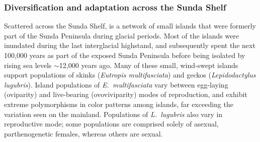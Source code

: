 \subsubsection*{Diversification and adaptation across the Sunda Shelf}
Scattered across the Sunda Shelf, is a network of small islands that were
formerly part of the Sunda Peninsula during glacial periods.
Most of the islands were inundated during the last interglacial highstand, and
subsequently spent the next 100,000 years as part of the exposed Sunda
Peninsula before being isolated by rising sea levels $\sim$12,000 years ago.
Many of these small, wind-swept islands support populations of skinks
(\emph{Eutropis multifasciata}) and geckos (\emph{Lepidodactylus lugubris}).
Island populations of \emph{E.\ multifasciata} vary between egg-laying
(oviparity) and live-bearing (ovoviviparity) modes of reproduction, and exhibit
extreme polymorphisms in color patterns among islands, far exceeding the
variation seen on the mainland.
Populations of \emph{L.\ lugubris} also vary in reproductive mode;
some populations are comprised solely of asexual, parthenogenetic females,
whereas others are sexual.

